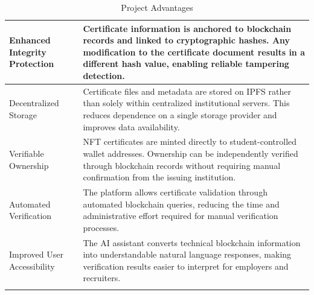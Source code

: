 \begin{longtable}{|m{3.5cm}|m{10.5cm}|}
    \hline
    
    Enhanced Integrity Protection 
    & Certificate information is anchored to blockchain records and linked to cryptographic hashes. Any modification to the certificate document results in a different hash value, enabling reliable tampering detection.\\
    \hline

    Decentralized Storage
    & Certificate files and metadata are stored on IPFS rather than solely within centralized institutional servers. This reduces dependence on a single storage provider and improves data availability.\\
    \hline

    Verifiable Ownership
    & NFT certificates are minted directly to student-controlled wallet addresses. Ownership can be independently verified through blockchain records without requiring manual confirmation from the issuing institution.\\
    \hline

    Automated Verification
    & The platform allows certificate validation through automated blockchain queries, reducing the time and administrative effort required for manual verification processes.\\
    \hline

    Improved User Accessibility
    & The AI assistant converts technical blockchain information into understandable natural language responses, making verification results easier to interpret for employers and recruiters.\\
    \hline

    \caption{Project Advantages}
    \label{tab:project_advantages}
\end{longtable}